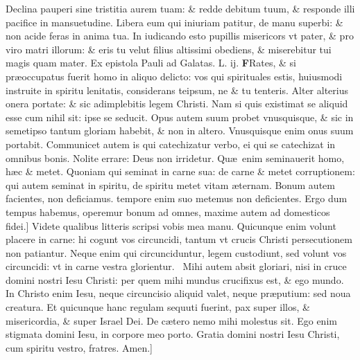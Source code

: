 \documentclass[a5paper,10pt]{book}
\def\leftmarginnote{%
	\lrmarginnote{\hskip -\marginparsep \hskip -6.5em}}
\def\ae{æ}
\begin{document}
\begin{multicols*}{2}
Declina pauperi sine tristitia aurem tuam: \& redde debitum tuum, \& responde illi pacifice in mansuetudine.
Libera eum qui iniuriam patitur, de manu superbi: \& non acide feras in anima tua. In iudicando esto pupillis misericors vt pater, \& pro viro
matri illorum: \& eris tu velut filius altissimi obediens, \& miserebitur tui magis quam mater.
\newline {} \color{red} Ex epistola Pauli ad Galatas. \hfill L. ij. \color{black}
\vspace{-.25em}
\lettrine[lines=2]{\bfseries \color{red} F}{}Rates, \& si\leftmarginnote{\begin{flushright}c.6.d\end{flushright}} pr\ae occupatus fuerit homo in aliquo delicto: vos qui spirituales estis, huiusmodi instruite in spiritu lenitatis, considerans teipsum, ne \& tu tenteris.
Alter alterius onera portate: \& sic adimplebitis legem Christi. Nam si quis existimat se aliquid esse cum nihil sit: ipse se seducit.
Opus autem suum probet vnusquisque, \& sic in semetipso tantum gloriam habebit, \& non in altero. Vnusquisque enim onus suum portabit.
Communicet autem is qui catechizatur verbo, ei qui se catechizat in omnibus bonis. Nolite errare: Deus non irridetur.
Qu\ae \ enim seminauerit homo, h\ae c \& metet. Quoniam qui seminat in carne sua: de carne \& metet corruptionem: qui autem seminat in spiritu, de spiritu metet vitam \ae ternam.
Bonum autem facientes, non deficiamus. tempore enim suo metemus non deficientes. Ergo dum tempus habemus, operemur bonum ad omnes, maxime autem ad domesticos fidei.]
Videte\leftmarginnote{\begin{flushright}E\end{flushright}} qualibus litteris scripsi vobis mea manu.
\newline Quicunque enim volunt placere in carne: hi cogunt vos circuncidi, tantum vt crucis Christi persecutionem non patiantur.
Neque enim qui circunciduntur, legem custodiunt, sed volunt vos circuncidi: vt in carne vestra glorientur. \textdagger \ 
Mihi\leftmarginnote{\begin{flushright}A\end{flushright}} autem absit gloriari, nisi in cruce domini nostri Iesu Christi: per quem mihi mundus crucifixus est, \& ego mundo.
In Christo enim Iesu, neque circuncisio aliquid valet, neque pr\ae putium: sed noua creatura.
Et quicunque hanc regulam sequuti fuerint, pax super illos, \& misericordia, \& super Israel Dei.
De c\ae tero nemo mihi molestus sit. Ego enim stigmata domini Iesu, in corpore meo porto. Gratia domini nostri Iesu Christi, cum spiritu vestro, fratres. Amen.]

\end{multicols*}
\end{document}

